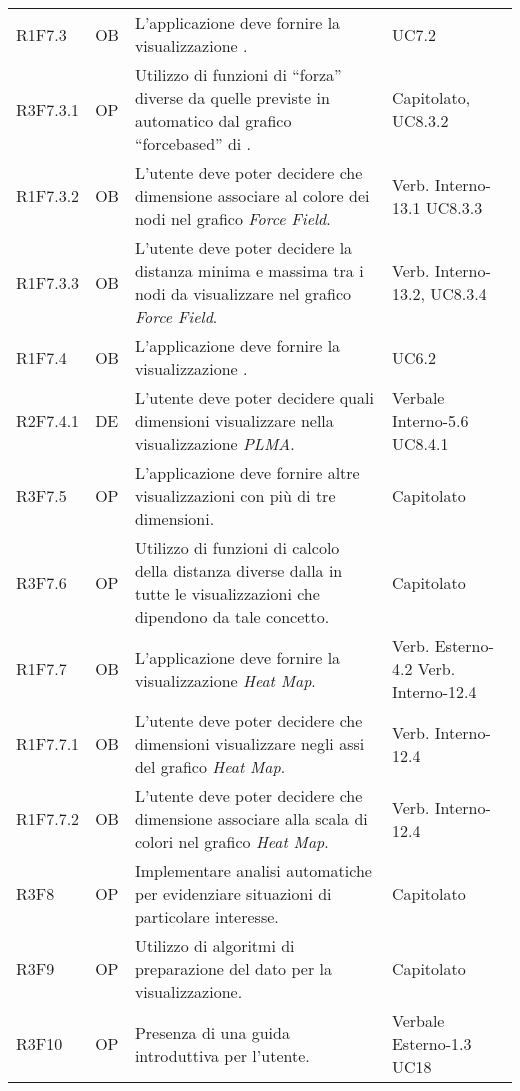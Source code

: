 {\begin{longtable}{C{2cm} | C{1.5cm} | C{9cm} | C{3.3cm}}
R1F7.3 & OB & L'applicazione deve fornire la visualizzazione . & UC7.2\\
R3F7.3.1 & OP & Utilizzo di funzioni di “forza” diverse da quelle previste in automatico dal grafico “forcebased” di . & Capitolato, UC8.3.2\\
R1F7.3.2 & OB & L'utente deve poter decidere che dimensione associare al colore dei nodi nel grafico \textit{Force Field}. & Verb. Interno-13.1 \newline UC8.3.3\\
R1F7.3.3 & OB & L'utente deve poter decidere la distanza minima e massima tra i nodi da visualizzare nel grafico \textit{Force Field}. & Verb. Interno-13.2, UC8.3.4\\
R1F7.4 & OB & L'applicazione deve fornire la visualizzazione . & UC6.2 \\
R2F7.4.1 & DE & L'utente deve poter decidere quali dimensioni visualizzare nella visualizzazione \textit{PLMA}. & Verbale Interno-5.6 \newline UC8.4.1\\
R3F7.5 & OP & L'applicazione deve fornire altre visualizzazioni con più di tre dimensioni. & Capitolato\\
R3F7.6 & OP & Utilizzo di funzioni di calcolo della distanza diverse dalla  in tutte le visualizzazioni che dipendono da tale concetto. & Capitolato \\
R1F7.7 & OB & L'applicazione deve fornire la visualizzazione \newline \textit{Heat Map}. & Verb. Esterno-4.2 \newline Verb. Interno-12.4\\
R1F7.7.1 & OB & L'utente deve poter decidere che dimensioni visualizzare negli assi del grafico \textit{Heat Map}. & Verb. Interno-12.4\\
R1F7.7.2 & OB & L'utente deve poter decidere che dimensione associare alla scala di colori nel grafico \textit{Heat Map}. & Verb. Interno-12.4\\
R3F8 & OP & Implementare analisi automatiche per evidenziare situazioni di particolare interesse. & Capitolato\\
R3F9 & OP & Utilizzo di algoritmi di preparazione del dato per la visualizzazione. & Capitolato\\
R3F10 & OP & Presenza di una guida introduttiva per l'utente. & Verbale Esterno-1.3 \newline UC18\\

\end{longtable}}
